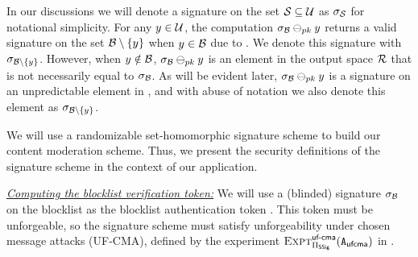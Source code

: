 %

\begin{remark}
In our discussions we will denote a signature on the set $\genericSetVar \subseteq\universe$ as $\genericSig[\genericSetVar]$ for notational simplicity. For any $\genericCInputElmt \in \universe$, the computation $\genericSig[\blocklist] \sigMinus[\pubKey] \genericCInputElmt$ returns a valid signature on the set $\genericSetDiff[\blocklist][\genericCInputElmt]$ when $\genericCInputElmt \in \blocklist$ due to . We denote this signature with $\genericSig[\genericSetDiff[\blocklist][\genericCInputElmt]]$. 
 However, when $\genericCInputElmt \notin \blocklist$, $\genericSig[\blocklist] \sigMinus[\pubKey] \genericCInputElmt$ is an element in the output space $\sigOutputSpace$ that is not necessarily equal to $\genericSig[\blocklist]$. As will be evident later, 
$\genericSig[\blocklist] \sigMinus[\pubKey] \genericCInputElmt$ is a signature on an unpredictable element in \sigOutputSpace, and with abuse of notation we also denote this element as $\genericSig[\genericSetDiff[\blocklist][\genericCInputElmt]]$. 
\end{remark}



%






%
We will use a randomizable set-homomorphic signature scheme to build our content moderation scheme. Thus, we present the security definitions of the signature scheme in the context of our application.  

\smallskip
\noindent\textit{\underline{Computing the blocklist verification token:}} We will 
use a (blinded) signature $\genericSig[\blocklist]$ on the blocklist as the blocklist authentication token \blklistToken{\blocklist}. 
This token must be unforgeable, so the signature scheme \ourSigScheme must satisfy unforgeability under chosen message attacks (UF-CMA), defined by the experiment $\Experiment{\ufcmaLabel}{\sigScheme}(\ufcmaAdversary)$ in . 



